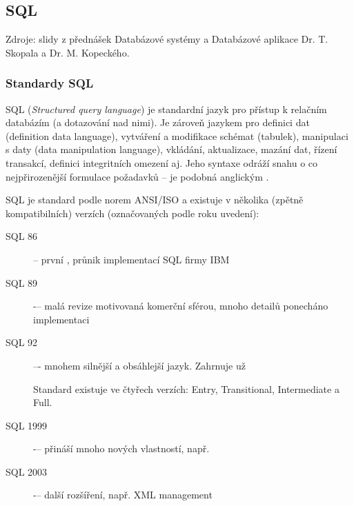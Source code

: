 \subsection{SQL}

Zdroje: slidy z přednášek Databázové systémy a Databázové aplikace Dr. T. Skopala a Dr. M. Kopeckého.

\subsubsection*{Standardy SQL}

SQL (\emph{Structured query language}) je standardní jazyk pro přístup k relačním databázím (a dotazování nad nimi). Je zároveň jazykem pro definici dat (definition data language), vytváření a modifikace schémat (tabulek), manipulaci s daty (data manipulation language), vkládání, aktualizace, mazání dat, řízení transakcí, definici integritních omezení aj. Jeho syntaxe odráží snahu o co nejpřirozenější formulace požadavků -- je podobná anglickým .

SQL je standard podle norem ANSI/ISO a existuje v několika (zpětně kompatibilních) verzích (označovaných podle roku uvedení):
\begin{description}
    \item[SQL 86] -- první , průnik implementací SQL firmy IBM
    \item[SQL 89] -– malá revize motivovaná komerční sférou, mnoho detailů ponecháno implementaci
    \item[SQL 92] –- mnohem silnější a obsáhlejší jazyk. Zahrnuje už
    Standard existuje ve čtyřech verzích: Entry, Transitional, Intermediate a Full.
    \item[SQL 1999] -– přináší mnoho nových vlastností, např. 
    \item[SQL 2003] -– další rozšíření, např. XML management
\end{description}

